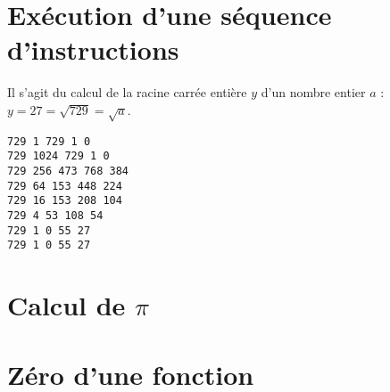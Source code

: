 \documentclass[11pt,a4paper]{article}
\begin{document}

\section{Exécution d'une séquence d'instructions}
%

\noindent\begin{minipage}{8cm}
Il s'agit du calcul de la racine carrée entière $y$ d'un nombre entier $a$ :
$y = 27 = \sqrt{729} = \sqrt{a}$.
\end{minipage}
\hfill
\begin{py}{7cm}
\begin{verbatim}
729 1 729 1 0
729 1024 729 1 0
729 256 473 768 384
729 64 153 448 224
729 16 153 208 104
729 4 53 108 54
729 1 0 55 27
729 1 0 55 27
\end{verbatim}
\end{py}

\section{Calcul de $\pi$}


\section{Zéro d'une fonction}


\newpage
\end{document}
